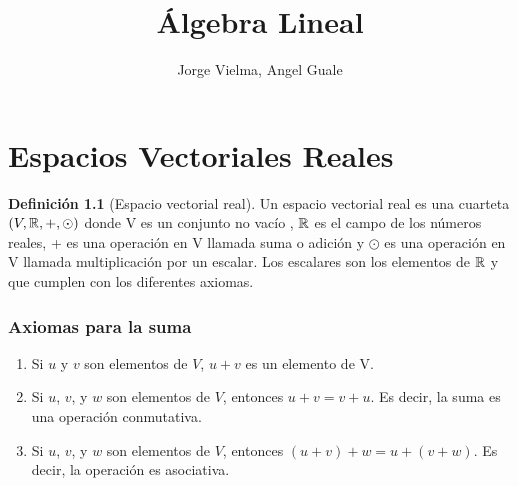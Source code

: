\documentclass[10pt,a4paper]{amsbook}
\author{Jorge Vielma, Angel Guale}
\title{Álgebra Lineal}
\theoremstyle{definition}
\newtheorem{dfn}[theorem]{Definición}
\theoremstyle{remark}
\numberwithin{section}{chapter}
\numberwithin{equation}{chapter}
\begin{document}
\maketitle
\setcounter{page}{4}
\tableofcontents


\chapter{Espacios Vectoriales Reales}
\begin{dfn}[Espacio vectorial real]
Un espacio vectorial real es una cuarteta $(V, \mathbb{R}, +, \odot)$ donde V es un conjunto no vacío , $\mathbb{R}$ es el campo de los números reales, + es una operación en V llamada suma o adición y $\odot$ es una operación en V llamada multiplicación por un escalar. Los escalares son los elementos de $\mathbb{R}$ y que cumplen con los diferentes axiomas.
\end{dfn}
\subsection*{Axiomas para la suma}
\begin{enumerate}
\item Si $u$ y $v$ son elementos de $V$, $u+v$ es un elemento de V.
\item Si $u$, $v$, y $w$ son elementos de $V$, entonces $u+v=v+u$. Es decir, la suma es una operación conmutativa.
\item Si $u$, $v$, y $w$ son elementos de $V$, entonces  $(u+v)+w=u+(v+w)$. Es decir, la operación es asociativa.
\end{enumerate}
\end{document}
